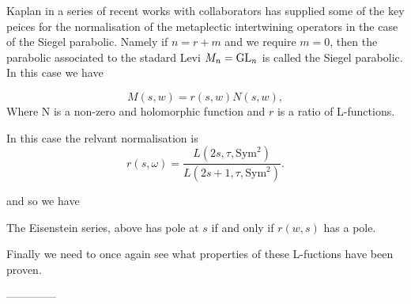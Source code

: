     Kaplan in a series of recent works with collaborators \cite{kaplanDoublingConstructionsComplete2021a}\cite{kaplanDoublingConstructionsTensor2020}\cite{caiDoublingConstructionsGlobal2024} has supplied some of the key peices for the normalisation of the metaplectic intertwining operators in the case of the Siegel parabolic. Namely if \(n = r+ m\) and we require \(m=0\), then the parabolic associated to the stadard Levi \(M_n = \operatorname{GL}_n\) is called the Siegel parabolic. In this case we have

    \begin{Theorem}
    \[M(s, w) = r(s,w)N(s,w),\]
    Where N is a non-zero and holomorphic function and \(r\) is a ratio of L-functions.
    \end{Theorem} 

    In this case the relvant normalisation is \cite[Eq. 1.5]{ginzburgTopFourierCoefficients2021}
    \[r(s,\omega) = \frac{ L(2s, \tau, \mathrm{Sym}^2)}{L(2s+1, \tau, \mathrm{Sym}^2)} .\]

    and so we have
    \begin{Lemma}
        The Eisenstein series,  above has pole at \(s\) if and only if \(r(w,s)\) has a pole.
     \end{Lemma}
     Finally we need to once again see what properties of these L-fuctions have been proven. 

    --------------

     \begin{Theorem}
        
     \end{Theorem}


     